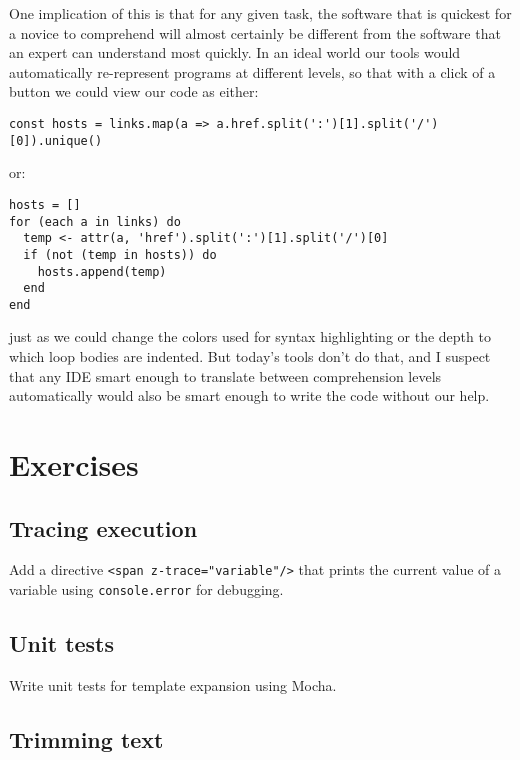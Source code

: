 \documentclass[krantzl]{krantz}
\begin{document}
One implication of this is that for any given task,
the software that is quickest for a novice to comprehend
will almost certainly be different from the software that
an expert can understand most quickly.
In an ideal world our tools would automatically re-represent programs at different levels,
so that with a click of a button we could view our code as either:

\begin{lstlisting}[frame=single,frameround=tttt]
const hosts = links.map(a => a.href.split(':')[1].split('/')[0]).unique()
\end{lstlisting}


or:

\begin{lstlisting}[frame=single,frameround=tttt]
hosts = []
for (each a in links) do
  temp <- attr(a, 'href').split(':')[1].split('/')[0]
  if (not (temp in hosts)) do
    hosts.append(temp)
  end
end
\end{lstlisting}


just as we could change the colors used for syntax highlighting
or the depth to which loop bodies are indented.
But today's tools don't do that,
and I suspect that any IDE smart enough to translate between comprehension levels automatically
would also be smart enough to write the code without our help.


\section{Exercises}\label{page-templates-exercises}

\subsection*{Tracing execution}


Add a directive \texttt{<span z-trace="variable"/>}
that prints the current value of a variable using \texttt{console.error} for debugging.

\subsection*{Unit tests}


Write unit tests for template expansion using Mocha.

\subsection*{Trimming text}
\end{document}
